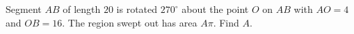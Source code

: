 Segment $AB$ of length $20$ is rotated $270^\circ$ about the point $O$ on $AB$ with $AO=4$ and $OB=16$. The region swept out has area $A\pi$. Find $A$.
